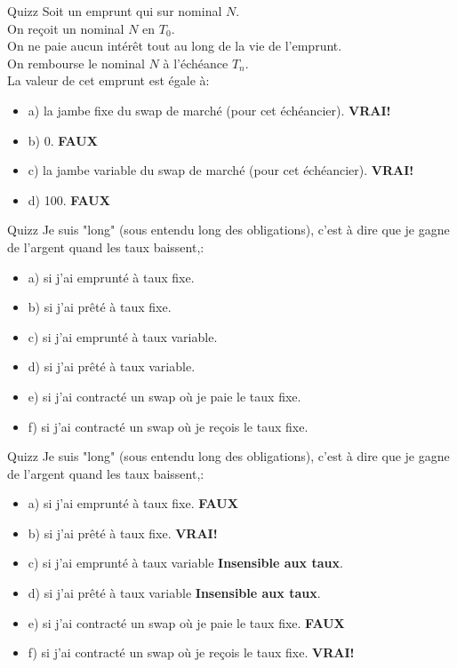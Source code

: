 \documentclass{beamer}
\begin{document}
\begin{frame}{Quizz}
Soit un emprunt qui sur nominal $N$.\\ 
On reçoit un nominal $N$ en $T_0$.\\
On ne paie aucun intérêt tout au long de la vie de l'emprunt.\\
On rembourse le nominal $N$ à l'échéance $T_n$.\\
\vspace{0.5cm}
La valeur de cet emprunt est égale à:
\begin{itemize}
\item a) la jambe fixe du swap de marché (pour cet échéancier). \textbf{\color{green}VRAI!}
\item b) 0. \textbf{\color{red}FAUX}
\item c) la jambe variable du swap de marché (pour cet échéancier). \textbf{\color{green}VRAI!}
\item d) 100. \textbf{\color{red}FAUX}
\end{itemize}
\end{frame}

\begin{frame}{Quizz}
Je suis "long" (sous entendu long des obligations), c'est à dire que je gagne de l'argent quand les taux baissent,:
\begin{itemize}
\item a) si j'ai emprunté à taux fixe.
\item b) si j'ai prêté à taux fixe.
\item c) si j'ai emprunté à taux variable. 
\item d) si j'ai prêté à taux variable.
\item e) si j'ai contracté un swap où je paie le taux fixe.
\item f) si j'ai contracté un swap où je reçois le taux fixe.
\end{itemize}
\end{frame}



\begin{frame}{Quizz}
Je suis "long" (sous entendu long des obligations), c'est à dire que je gagne de l'argent quand les taux baissent,:
\begin{itemize}
\item a) si j'ai emprunté à taux fixe. \textbf{\color{red}FAUX}
\item b) si j'ai prêté à taux fixe. \textbf{\color{green}VRAI!}
\item c) si j'ai emprunté à taux variable \textbf{Insensible aux taux}. 
\item d) si j'ai prêté à taux variable \textbf{Insensible aux taux}.
\item e) si j'ai contracté un swap où je paie le taux fixe. \textbf{\color{red}FAUX}
\item f) si j'ai contracté un swap où je reçois le taux fixe. \textbf{\color{green}VRAI!}
\end{itemize}
\end{frame}
\end{document}

